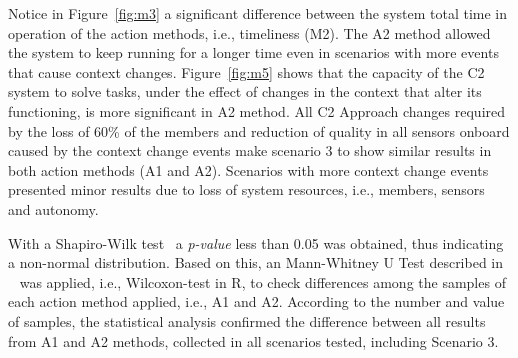 Notice in Figure~\ref{fig:m3} a significant difference between the system total time in operation of the action methods, i.e., timeliness (M2). The A2 method allowed the system to keep running for a longer time even in scenarios with more events that cause context changes. Figure~\ref{fig:m5} shows that the capacity of the C2 system to solve tasks, under the effect of changes in the context that alter its functioning, is more significant in A2 method.
All C2 Approach changes required by the loss of 60\% of the members and reduction of quality in all sensors onboard caused by the context change events make scenario 3 to show similar results in both action methods (A1 and A2). Scenarios with more context change events presented minor results due to loss of system resources, i.e., members, sensors and autonomy.





With a Shapiro-Wilk test~\citep{stat001} a \textit{p-value} less than 0.05 was obtained, thus indicating a non-normal distribution. Based on this, an Mann-Whitney U Test described in ~\cite{stat002} was applied, i.e., Wilcoxon-test in R, to check differences among the samples of each action method applied, i.e., A1 and A2. According to the number and value of samples, the statistical analysis confirmed the difference between all results from A1 and A2 methods, collected in all scenarios tested, including Scenario 3.

